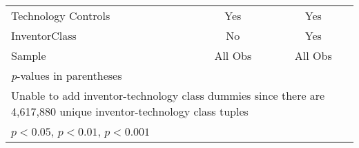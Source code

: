 {\begin{longtable}{l*{2}{c}}
Technology Controls            &      Yes         &      Yes         \\
InventorClass   &       No         &      Yes         \\
Sample          &  All Obs         &  All Obs         \\
\hline\hline
\multicolumn{3}{l}{\footnotesize \textit{p}-values in parentheses}\\
\multicolumn{3}{l}{\footnotesize Unable to add inventor-technology class dummies since there are 4,617,880 unique inventor-technology class tuples}\\
\multicolumn{3}{l}{\footnotesize \sym{*} \(p<0.05\), \sym{**} \(p<0.01\), \sym{***} \(p<0.001\)}\\
\end{longtable}
}
